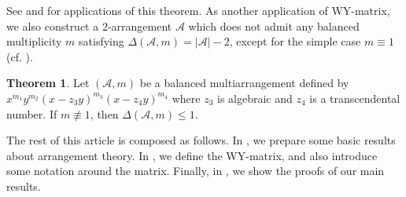 \documentclass[12pt]{amsart}
\theoremstyle{definition}
\newtheorem{theorem}[definition]{Theorem}
\newcommand{\NN}{\mathbb{N}}
\newcommand{\AAA}{\mathcal{A}}
\begin{document}
See  and  for applications of this theorem. 
As another application of WY-matrix, %
we also construct a $2$-arrangement $\AAA$ 
which does not admit any balanced multiplicity $m$ satisfying $\Delta(\AAA,m)=|\AAA|-2$, 
except for the simple case $m\equiv1$ (cf. ). 
%
%
%

\begin{theorem}
\label{theorem: no peak points}
Let $(\AAA,m)$ be a balanced multiarrangement defined by 
$x^{m_1}y^{m_2}(x-z_3y)^{m_3}(x-z_4y)^{m_4}$ %
where $z_3$ is algebraic and $z_4$ is a transcendental number. 
If $m\not\equiv 1$, then $\Delta(\AAA,m)\leq1$. 
\end{theorem}

The rest of this article is composed as follows. 
In , we prepare some basic results 
about arrangement theory. 
In , we define the WY-matrix, 
and also introduce some notation around the matrix. 
Finally, in , we show the proofs of our main results. 
%
\end{document}
